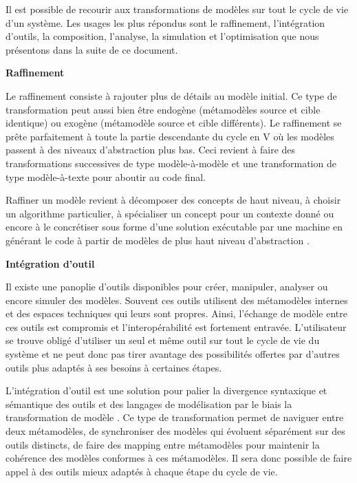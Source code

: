 Il est possible de recourir aux transformations de modèles sur tout le cycle de vie d'un système. Les usages les plus répondus sont le raffinement, l'intégration d'outils, la composition, l'analyse, la simulation et l'optimisation que nous présentons dans la suite de ce document. 

\begin{description}

\item \textbf{Raffinement}

Le raffinement consiste à rajouter plus de détails au modèle initial. Ce type de transformation peut aussi bien être endogène (métamodèles source et cible identique) ou exogène (métamodèle source et cible différents). Le raffinement se prête parfaitement à toute la partie descendante du cycle en V où les modèles passent à des niveaux d'abstraction plus bas. Ceci revient à faire des transformations successives de type modèle-à-modèle et une transformation de type modèle-à-texte pour aboutir au code final.

Raffiner un modèle revient à décomposer des concepts de haut niveau, à choisir un algorithme particulier, à spécialiser un concept pour un contexte donné ou encore à le concrétiser sous forme d'une solution exécutable par une machine en générant le code à partir de modèles de plus haut niveau d'abstraction \cite{czarnecki2000intentional}. 

\item \textbf{Intégration d'outil}

Il existe une panoplie d'outils disponibles pour créer, manipuler, analyser ou encore simuler des modèles. Souvent ces outils utilisent des métamodèles internes et des espaces techniques qui leurs sont propres. Ainsi, l'échange de modèle entre ces outils est compromis et l'interopérabilité est fortement entravée. L'utilisateur se trouve obligé d'utiliser un seul et même outil sur tout le cycle de vie du système et ne peut donc pas tirer avantage des possibilités offertes par d'autres outils plus adaptés à ses besoins à certaines étapes.

L'intégration d'outil est une solution pour palier la divergence syntaxique et sémantique des outils et des langages de modélisation par le biais la transformation de modèle \cite{tratt2005model}. Ce type de transformation permet de naviguer entre deux métamodèles, de synchroniser des modèles qui évoluent séparément sur des outils distincts, de faire des mapping entre métamodèles pour maintenir la cohérence des modèles conformes à ces métamodèles. Il sera donc possible de faire appel à des outils mieux adaptés à chaque étape du cycle de vie.


\end{description}
